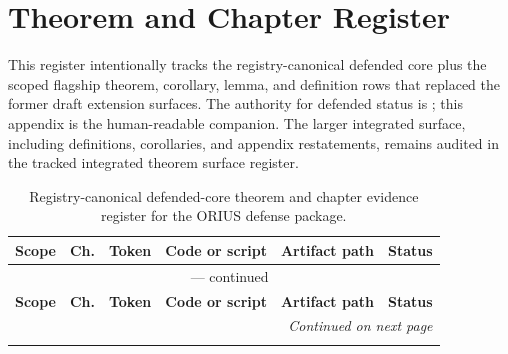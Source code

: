 \section{Theorem and Chapter Register}

This register intentionally tracks the registry-canonical defended core plus
the scoped flagship theorem, corollary, lemma, and definition rows that replaced
the former draft extension surfaces.  The authority for defended status is
; this appendix is the
human-readable companion.  The larger integrated surface, including
definitions, corollaries, and appendix restatements, remains audited in the
tracked integrated theorem surface register.

\begin{scriptsize}
\setlength{\tabcolsep}{2pt}
\begin{longtable}{@{}p{1.2cm}p{0.8cm}p{2.6cm}p{3.1cm}p{3.6cm}p{1.3cm}@{}}
\caption{Registry-canonical defended-core theorem and chapter evidence register
for the ORIUS defense package.}
\label{tab:battery-claim-register} \\
\toprule
\textbf{Scope} & \textbf{Ch.} & \textbf{Token} & \textbf{Code or script} &
\textbf{Artifact path} & \textbf{Status} \\
\midrule
\endfirsthead

\multicolumn{6}{c}{\tablename\ \thetable{} --- continued} \\
\toprule
\textbf{Scope} & \textbf{Ch.} & \textbf{Token} & \textbf{Code or script} &
\textbf{Artifact path} & \textbf{Status} \\
\midrule
\endhead

\midrule
\multicolumn{6}{r}{\textit{Continued on next page}} \\
\endfoot

\bottomrule
\endlastfoot


\end{longtable}
\end{scriptsize}

